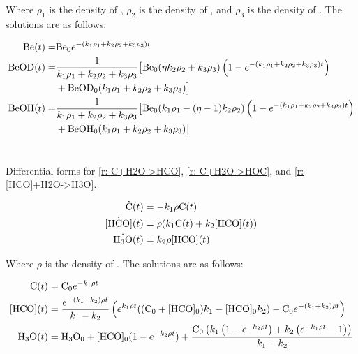 Where $\rho_1$ is the density of , $\rho_2$ is the density of , and $\rho_3$ is the density of . The solutions are as follows:

\begin{align}
	\ce{Be}(t) = &  \ce{Be0} e^{-(k_1 \rho_1+k_2 \rho_2+k_3 \rho_3)t} \\
	\ce{BeOD}(t) = & \frac{1}{k_1 \rho_1+k_2 \rho_2+k_3 \rho_3} \big[\ce{Be0} (\eta k_2 \rho_2+k_3 \rho_3) \left(1-e^{-(k_1 \rho_1+k_2 \rho_2+k_3 \rho_3)t}\right) \\
	& +\ce{BeOD0} (k_1 \rho_1+k_2 \rho_2+k_3 \rho_3)\big] \\
	\ce{BeOH}(t) = & \frac{1}{k_1 \rho_1+k_2 \rho_2+k_3 \rho_3}\big[\ce{Be0} (k_1 \rho_1-(\eta-1) k_2 \rho_2) \left(1 - e^{-(k_1 \rho_1+k_2 \rho_2+k_3 \rho_3)t}\right) \\
	& + \ce{BeOH0} (k_1 \rho_1+k_2 \rho_2+k_3 \rho_3)\big]
\end{align}

\section{}

Differential forms for \ref{r: C+H2O->HCO}, \ref{r: C+H2O->HOC}, and \ref{r: [HCO]+H2O->H3O}.

\begin{align}
	\dot{\ce{C}}(t) & = -k_1 \rho \ce{C}(t) \\
	\dot{\ce{[HCO]}}(t) & = \rho(k_1 \ce{C}(t) + k_2 \ce{[HCO]}(t)) \\
	\dot{\ce{H3O}}(t) & = k_2 \rho \ce{[HCO]}(t)
\end{align}

Where $\rho$ is the density of . The solutions are as follows:

\begin{align}
	\ce{C}(t) & = \ce{C0} e^{-k_1 \rho t} \\
	\ce{[HCO]}(t) & = \frac{e^{-(k_1 + k_2) \rho t}}{k_1 - k_2} \left(e^{k_1 \rho t}((\ce{C0} + \ce{[HCO]0})k_1 - \ce{[HCO]0} k_2) - \ce{C0} e^{-(k_1 + k_2) \rho t}\right) \\
	\ce{H3O}(t) & = \ce{H3O0} + \ce{[HCO]0} (1 - e^{-k_2 \rho t}) + \frac{\ce{C0}\left( k_1 \left(1 - e^{-k_2 \rho t}\right) + k_2 \left(e^{-k_1 \rho t} - 1\right) \right)}{k_1 - k_2}
\end{align}